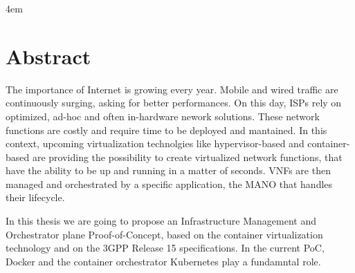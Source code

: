 \cleardoublepage
{}

\thispagestyle{empty}

\vspace*{\fill}
\par
\begingroup
\leftskip4em
\rightskip\leftskip
\section*{\centering Abstract}
The importance of Internet is growing every year. Mobile and wired traffic are
continuously surging, asking for better performances. On this day, ISPs rely on
optimized, ad-hoc and often in-hardware nework solutions. These network
functions are costly and require time to be deployed and mantained. In this
context, upcoming virtualization technolgies like hypervisor-based and
container-based are providing the possibility to create virtualized network
functions, that have the ability to be up and running in a matter of seconds.
VNFs are then managed and orchestrated by a specific application, the MANO that
handles their lifecycle.

In this thesis we are going to propose an Infrastructure Management and
Orchestrator plane Proof-of-Concept, based on the container virtualization
technology and on the 3GPP Release 15 specifications. In the current PoC, Docker
and the container orchestrator Kubernetes play a fundamntal role.
\par
\endgroup
\vspace*{\fill}

